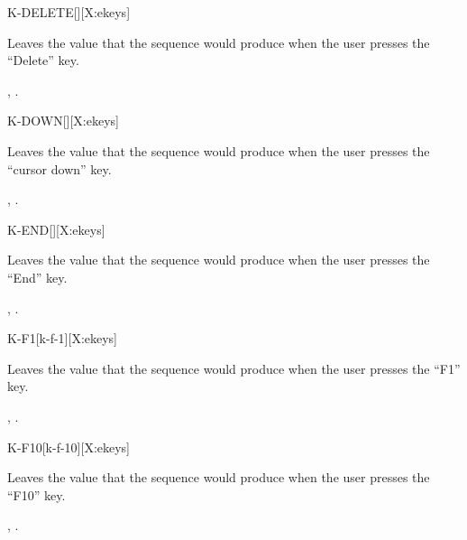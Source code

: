 \begin{worddef}{}{K-DELETE}[][X:ekeys]
\item {}

	Leaves the value  that the sequence 
	 would produce when the user presses the
	``Delete'' key.

\see {},
	.
\end{worddef}


\begin{worddef}{}{K-DOWN}[][X:ekeys]
\item {}

	Leaves the value  that the sequence 
	 would produce when the user presses the
	``cursor down'' key.

\see {},
	.
\end{worddef}


\begin{worddef}{}{K-END}[][X:ekeys]
\item {}

	Leaves the value  that the sequence 
	 would produce when the user presses the
	``End'' key.

\see {},
	.
\end{worddef}


\begin{worddef}{}{K-F1}[k-f-1][X:ekeys]
\item {}

	Leaves the value  that the sequence 
	 would produce when the user presses the
	``F1'' key.

\see {},
	.
\end{worddef}


\begin{worddef}{}{K-F10}[k-f-10][X:ekeys]
\item {}

	Leaves the value  that the sequence 
	 would produce when the user presses the
	``F10'' key.

\see {},
	.
\end{worddef}


